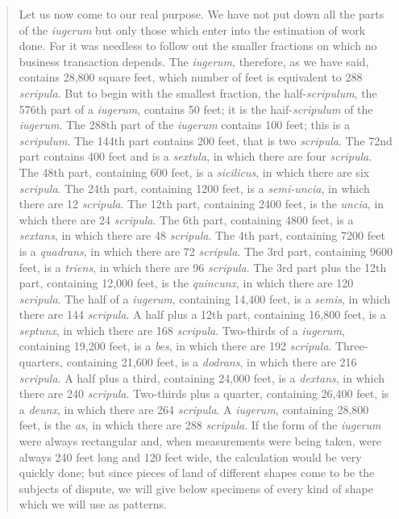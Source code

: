 \documentclass{amsart}
\theoremstyle{definition}
\begin{document}
\begin{quote}
Let us now come to our real purpose. We have not put down all the parts of the {\em iugerum} but only those which enter into the estimation of work done. For it was needless to
follow out the smaller fractions on which no business transaction depends. The {\em iugerum}, therefore, as we have said, contains 28,800 square feet, which number of feet is 
equivalent to 288 {\em scripula}. But to begin with the smallest fraction, the half-{\em scripulum}, the 576th part of a {\em iugerum}, contains 50 feet; it is the haif-{\em scripulum} of
the {\em iugerum}. The 288th part of the {\em iugerum} contains 100 feet; this is a {\em scripulum}. The 144th part contains 200 feet, that is two {\em scripula}. The 72nd part contains 
400 feet and is a {\em sextula}, in which there are four {\em scripula}. The 48th part, containing 600 feet, is a {\em sicilicus}, in which there
are six {\em scripula}. The 24th part, containing 1200 feet, is a {\em semi-uncia}, in which there are 12 {\em scripula}. The 12th part, containing 2400 feet, is the {\em uncia}, in
which there are 24 {\em scripula}. The 6th part, containing 4800 feet, is a {\em sextans}, in which there are 48 {\em scripula}. The 4th part, containing 7200 feet is a {\em quadrans},
in which there are 72 {\em scripula}. The 3rd part, containing 9600 feet, is a {\em triens}, in which there are 96 {\em scripula}. The 3rd part plus the 12th part, containing 12,000 feet,
is the {\em quincunx}, in which there are 120 {\em scripula}. The half of a {\em iugerum}, containing 14,400 feet, is a {\em semis}, in which there are 144 {\em scripula}. A half plus
a 12th part, containing 16,800 feet, is a {\em septunx}, in which there are 168 {\em scripula}. Two-thirds of a {\em iugerum}, containing 19,200 feet, is a {\em bes}, in which there are
192 {\em scripula}. Three-quarters, containing 21,600 feet, is a {\em dodrans}, in which there are 216 {\em scripula}. A half plus a third, containing 24,000 feet, is a {\em dextans},
in which there are 240 {\em scripula}. Two-thirds plus a quarter, containing 26,400 feet, is a {\em deunx}, in which there are 264 {\em scripula}. A {\em iugerum}, containing 28,800
feet, is the {\em as}, in which there are 288 {\em scripula}. If the form of the {\em iugerum} were always rectangular and, when measurements were being taken, were always
240 feet long and 120 feet wide, the calculation would be very quickly done; but since pieces of land of different shapes come to be the subjects of dispute, we will give below
specimens of every kind of shape which we will use as patterns.
\end{quote}
\end{document}

